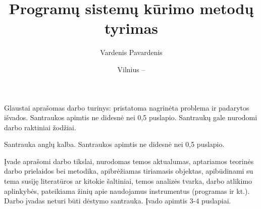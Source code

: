 \documentclass{VUMIFPSmagistrinis}
\title{Programų sistemų kūrimo metodų tyrimas}
\author{Vardenis Pavardenis}
\date{Vilnius – \the\year}
\begin{document}
\maketitle


Glaustai aprašomas darbo turinys: pristatoma nagrinėta problema ir padarytos
išvados. Santraukos apimtis ne didesnė nei 0,5 puslapio. Santraukų gale
nurodomi darbo raktiniai žodžiai. 

Santrauka anglų kalba. Santraukos apimtis ne didesnė nei 0,5 puslapio.

\tableofcontents

Įvade aprašomi darbo tikslai, nurodomas temos aktualumas, aptariamos teorinės
darbo prielaidos bei metodika, apibrėžiamas tiriamasis objektas,
apibūdinami su tema susiję literatūros ar kitokie šaltiniai, temos analizės
tvarka, darbo atlikimo aplinkybės, pateikiama žinių apie naudojamus
instrumentus (programas ir kt.). Darbo įvadas neturi būti dėstymo santrauka.
Įvado apimtis 3-4 puslapiai.
\end{document}
